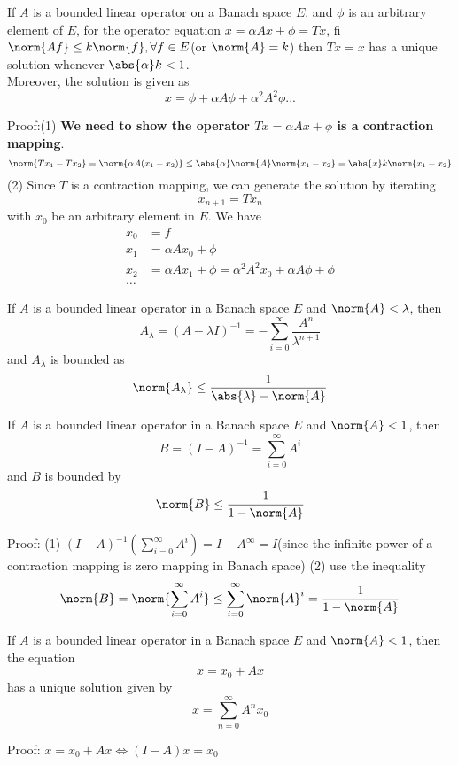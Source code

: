 \begin{refsection}
\begin{theorem}
	\cite[225]{debnath2005hilbert}If $A$ is a bounded linear operator on a Banach space $E$, and $\phi$ is an arbitrary element of $E$, for the operator equation $x = \alpha A x + \phi = Tx$, fi $\norm{Af} \leq k\norm{f},\forall f\in E$(or $\norm{A} = k$) then $Tx=x$ has a unique solution whenever $\abs{\alpha} k < 1$. \\
	Moreover, the solution is given as
	$$x = \phi + \alpha A\phi + \alpha^2A^2\phi ...$$
\end{theorem}
Proof:(1) \textbf{We need to show the operator $Tx = \alpha A x + \phi$ is a contraction mapping}. 
$$\norm{Tx_1 - Tx_2} = \norm{\alpha A (x_1 - x_2)} \leq \abs{\alpha}\norm{A}\norm{x_1 - x_2} = \abs{x}k\norm{x_1-x_2}$$
(2) Since $T$ is a contraction mapping, we can generate the solution by iterating 
$$x_{n+1} = Tx_n$$
with $x_0$ be an arbitrary element in $E$.
We have
\begin{align*}
x_0 &= f\\
x_1 &= \alpha A x_0 + \phi\\
x_2 &= \alpha A x_1 + \phi = \alpha^2 A^2 x_0 + \alpha A \phi + \phi\\
\dots
\end{align*}

\begin{theorem}
	\cite[226]{debnath2005hilbert}If $A$ is a bounded linear operator in a Banach space $E$ and $\norm{A} < \lambda$, then
	$$A_\lambda = (A - \lambda I)^{-1} = -\sum_{i=0}^\infty \frac{A^n}{\lambda^{n+1}}$$
	and
	$A_\lambda$ is bounded as
	$$\norm{A_\lambda} \leq \frac{1}{\abs{\lambda} - \norm{A}}$$
\end{theorem}

\begin{corollary}
	If $A$ is a bounded linear operator in a Banach space $E$ and $\norm{A} < 1$, then
	$$B = (I - A)^{-1} = \sum_{i=0}^\infty A^i$$
	and $B$ is bounded by 
	$$\norm{B} \leq \frac{1}{1-\norm{A}}$$
\end{corollary}
Proof: (1) $(I - A)^{-1} (\sum_{i=0}^\infty A^i) = I-A^\infty = I$(since the infinite power of a contraction mapping is zero mapping in Banach space) (2) use the inequality 
$$\norm{B} = \norm{\sum_{i=0}^\infty A^i} \leq \sum_{i=0}^\infty \norm{A}^i = \frac{1}{1-\norm{A}} $$

\begin{corollary}
	If $A$ is a bounded linear operator in a Banach space $E$ and $\norm{A} < 1$, then the equation
	$$x = x_0 + Ax$$
	has a unique solution given by
	$$x = \sum_{n=0}^\infty A^n x_0$$
\end{corollary}
Proof: $x=x_0+Ax \Leftrightarrow (I-A)x = x_0$




\end{refsection}

